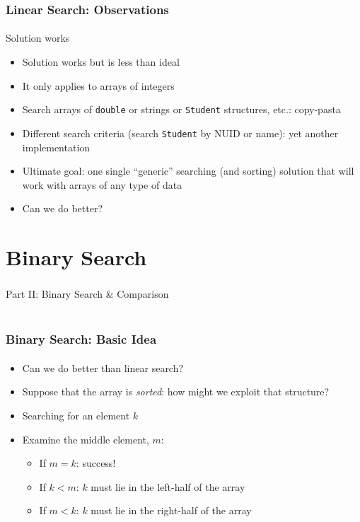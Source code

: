 \documentclass[]{beamer}
\begin{document}
\begin{frame}[fragile]
  \frametitle{Linear Search: Observations}
  \framesubtitle{}

Solution works
\begin{itemize}[<+->]
  \item Solution works but is less than ideal
  \item It only applies to arrays of integers
  \item Search arrays of \texttt{double} or strings or
  \texttt{Student} structures, etc.: copy-pasta
  \item Different search criteria (search \texttt{Student} by NUID or name): yet another implementation
  \item Ultimate goal: one single ``generic'' searching (and sorting) solution that will work with arrays of any type of data
  \item Can we do better? %
\end{itemize}

\end{frame}

\section{Binary Search}

\begin{frame}
    \frametitle{}
    \framesubtitle{}
    
    \begin{center}
    {\Huge Part II: Binary Search \& Comparison}\\
    {\Large ~}
    \end{center}

\end{frame}

\begin{frame}[fragile]
  \frametitle{Binary Search: Basic Idea}
  \framesubtitle{}

\begin{itemize}[<+->]
  \item Can we do better than linear search?
  \item Suppose that the array is \emph{sorted}: how might we exploit that structure?
  \item Searching for an element $k$
  \item Examine the middle element, $m$:
  \begin{itemize}
    \item If $m = k$: success!
    \item If $k < m$: $k$ must lie in the left-half of the array
    \item If $m < k$: $k$ must lie in the right-half of the array
  \end{itemize}
\end{itemize}

\end{frame}
\end{document}
